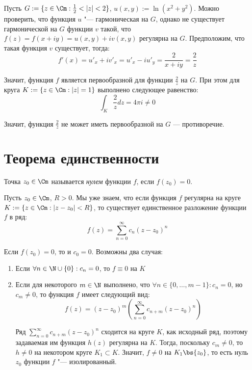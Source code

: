 \begin{example}
	Пусть $G := \{z \in \Cm : \frac12 < |z| < 2\}$, $u(x, y) := \ln(x^2 + y^2)$. Можно проверить, что функция $u$ "--- гармоническая на $G$, однако не существует гармонической на $G$ функции $v$ такой, что $f(z) = f(x + iy) = u(x, y) + iv(x, y)$ регулярна на $G$. Предположим, что такая функция $v$ существует, тогда:
	\[f'(x) = u'_x + iv'_x = u'_x - iu'_y = \frac{2}{x + iy} = \frac 2z\]
	
	Значит, функция $f$ является первообразной для функции $\frac 2z$ на $G$. При этом для круга $K := \{z \in \Cm: |z| = 1\}$ выполнено следующее равенство:
	\[\int_{K} \frac 2zdz = 4\pi i \ne 0\]
	
	Значит, функция $\frac2z$ не может иметь первообразной на $G$ --- противоречие.
\end{example}

\section{Теорема единственности}

\begin{definition}
	Точка $z_0 \in \Cm$ называется \textit{нулем} функции $f$, если $f(z_0) = 0$.
\end{definition}

\begin{note}
	Пусть $z_0 \in \Cm$, $R > 0$. Мы уже знаем, что если функция $f$ регулярна на круге $K := \{z \in \Cm: |z - z_0| < R\}$, то существует единственное разложение функции $f$ в ряд:
	\[f(z) = \sum_{n=0}^\infty c_n(z - z_0)^n\]
	
	Если $f(z_0) = 0$, то и $c_0 = 0$. Возможны два случая:
	\begin{enumerate}
		\item Если $\forall n \in \N\cup \{0\}: c_n = 0$, то $f \equiv 0$ на $K$
		\item Если для некоторого $m \in \N$ выполнено, что $\forall n \in \{0, \dotsc, m - 1\}: c_n = 0$, но $c_m \ne 0$, то функция $f$ имеет следующий вид:
		\[f(z) = (z - z_0)^m\left(\sum_{n = 0}^\infty c_{n + m}(z - z_0)^n\right)\]
		
		Ряд $\sum_{n = 0}^\infty c_{n + m}(z - z_0)^n$ сходится на круге $K$, как исходный ряд, поэтому задаваемая им функция $h(z)$ регулярна на $K$. Тогда, поскольку $c_m \ne 0$, то $h \ne 0$ на некотором круге $K_1 \subset K$. Значит, $f \ne 0$ на $K_1 \bs \{z_0\}$, то есть нуль $z_0$ функции $f$ "--- изолированный.
	\end{enumerate}
\end{note}

